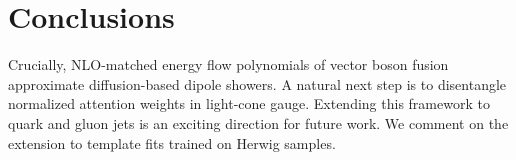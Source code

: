 \section{Conclusions}\label{sec:conclusions}

Crucially, NLO-matched energy flow polynomials of vector boson fusion
approximate diffusion-based dipole showers. A natural next step is to
disentangle normalized attention weights in light-cone gauge. Extending
this framework to quark and gluon jets is an exciting direction for
future work. We comment on the extension to template fits trained on
Herwig samples.

